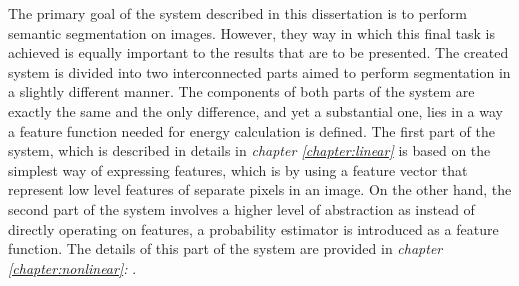 The primary goal of the system described in this dissertation is to perform semantic segmentation on images. However, they way in which this final task is achieved is equally important to the results that are to be presented. The created system is divided into two interconnected parts aimed to perform segmentation in a slightly different manner. The components of both parts of the system are exactly the same and the only difference, and yet a substantial one, lies in a way a feature function needed for energy calculation is defined. The first part of the system, which is described in details in \textit{chapter \ref{chapter:linear}} is based on the simplest way of expressing features, which is by using a feature vector that represent low level features of separate pixels in an image. On the other hand, the second part of the system involves a higher level of abstraction as instead of directly operating on features, a probability estimator is introduced as a feature function. The details of this part of the system are provided in \textit{chapter \ref{chapter:nonlinear}: }.